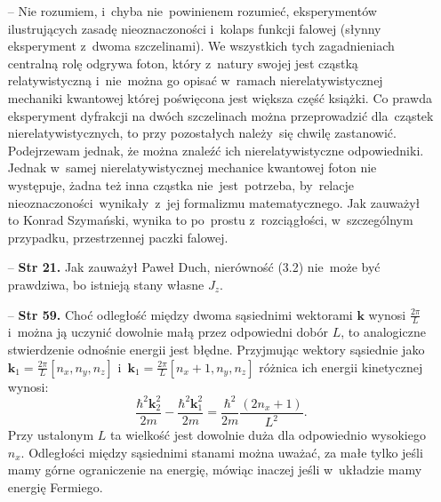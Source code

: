


\begin{itemize}
\item[--] Nie rozumiem, i~chyba nie~powinienem rozumieć, eksperymentów
  ilustrujących zasadę nieoznaczoności i~kolaps funkcji falowej
  (słynny eksperyment z~dwoma szczelinami). We wszystkich tych
  zagadnieniach centralną rolę odgrywa foton, który z~natury swojej
  jest cząstką relatywistyczną i~nie~można go opisać w~ramach
  nierelatywistycznej mechaniki kwantowej której poświęcona jest
  większa część książki. Co prawda eksperyment dyfrakcji na dwóch
  szczelinach można przeprowadzić dla~cząstek nierelatywistycznych, to
  przy pozostałych należy~się chwilę zastanowić. Podejrzewam jednak,
  że można znaleźć ich nierelatywistyczne odpowiedniki. Jednak w~samej
  nierelatywistycznej mechanice kwantowej foton nie występuje, żadna
  też inna cząstka nie~jest~potrzeba, by~relacje
  nieoznaczoności~wynikały~z~jej formalizmu matematycznego. Jak
  zauważył to Konrad Szymański, wynika to po~prostu z~rozciągłości,
  w~szczególnym przypadku, przestrzennej paczki falowej.
\item[--] \textbf{Str 21.} Jak zauważył Paweł Duch, nierówność (3.2)
  nie~może być prawdziwa, bo istnieją stany własne $J_{ z }$.
\item[--] \textbf{Str 59.} Choć odległość między dwoma sąsiednimi
  wektorami $\mathbf{k}$ wynosi $\frac{ 2 \pi }{ L }$ i~można ją
  uczynić dowolnie małą przez odpowiedni dobór $L$, to analogiczne
  stwierdzenie odnośnie energii jest błędne. Przyjmując wektory
  sąsiednie jako
  $\mathbf{k}_{ 1 } = \frac{ 2 \pi }{ L } [ n_{ x }, n_{ y }, n_{ z }
  ]$
  i~$\mathbf{k}_{ 1 } = \frac{ 2 \pi }{ L } [ n_{ x } + 1, n_{ y },
  n_{ z } ]$ różnica ich energii kinetycznej wynosi:
  \begin{displaymath}
    \frac{ \hbar^{ 2 } \mathbf{k}_{ 2 }^{ 2 } }{ 2 m } - \frac{ \hbar^{ 2 } \mathbf{k}_{ 1 }^{ 2 } }{ 2 m } = \frac{ \hbar^{ 2 } }{ 2 m } \frac{ ( 2 n_{ x } + 1 ) }{ L^{ 2 } }.
  \end{displaymath}
  Przy ustalonym $L$ ta wielkość jest dowolnie duża dla odpowiednio
  wysokiego $n_{ x }$. Odległości między sąsiednimi stanami można
  uważać, za małe tylko jeśli mamy górne ograniczenie na energię,
  mówiąc inaczej jeśli w~układzie mamy energię Fermiego.
\end{itemize}


